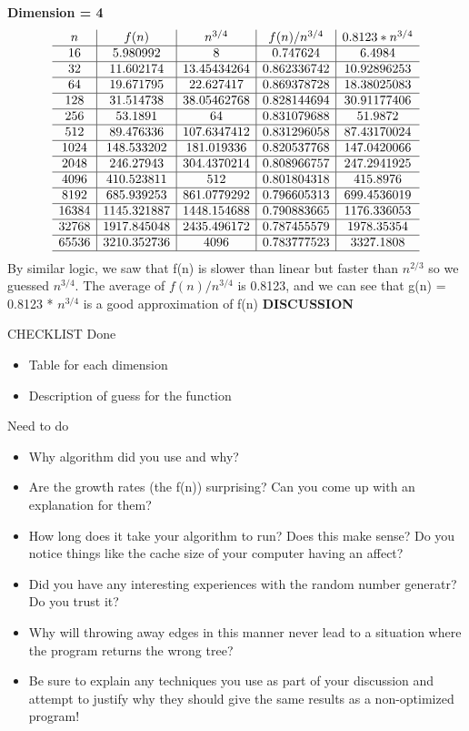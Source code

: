 \documentclass[11pt]{article}
\begin{document}
\textbf{Dimension = 4}
$$
\begin{array}{c|c|c|c|c}
n & f(n) & n^{3/4} & f(n)/n^{3/4}  & 0.8123 * n^{3/4} \\ \hline 
16 & 5.980992 & 8 & 0.747624  & 6.4984\\ \hline
32 & 11.602174 &  13.45434264 & 0.862336742 & 10.92896253 \\ \hline
64 & 19.671795  & 22.627417 & 0.869378728 & 18.38025083\\ \hline
128 & 31.514738 & 38.05462768 & 0.828144694 & 30.91177406\\ \hline
256 & 53.1891 & 64 & 0.831079688 & 51.9872\\ \hline
512 & 89.476336  & 107.6347412  & 0.831296058 & 87.43170024\\ \hline
1024 & 148.533202 & 181.019336 & 0.820537768 & 147.0420066 \\ \hline
2048 & 246.27943  & 304.4370214 & 0.808966757 & 247.2941925 \\ \hline
4096 & 410.523811 & 512 & 0.801804318 & 415.8976 \\ \hline
8192 & 685.939253 & 861.0779292 & 0.796605313 & 699.4536019 \\ \hline
16384 & 1145.321887 & 1448.154688 & 0.790883665 & 1176.336053\\ \hline
32768 & 1917.845048 & 2435.496172 & 0.787455579 & 1978.35354 \\ \hline
65536 & 3210.352736 & 4096 & 0.783777523 & 3327.1808 \\ \hline
\end{array}
$$
By similar logic, we saw that f(n) is slower than linear but faster than $n^{2/3}$ so we guessed $n^{3/4}$. The average of $f(n)/n^{3/4}$ is 0.8123, and we can see that g(n) = 0.8123 * $n^{3/4}$ is a good approximation of f(n)
\newpage
\textbf{DISCUSSION}

CHECKLIST \newline
Done
\begin{itemize}
\item Table for each dimension
\item Description of guess for the function 
\end{itemize}
Need to do
\begin{itemize}

\item Why algorithm did you use and why? 
\item Are the growth rates (the f(n)) surprising? Can you come up with an explanation for them?
\item How long does it take your algorithm to run? Does this make sense? Do you notice things like the cache size of your computer having an affect?
\item Did you have any interesting experiences with the random number generatr? Do you trust it?
\item Why will throwing away edges in this manner never lead to a situation where the program returns the wrong tree? 
\item Be sure to explain any techniques you use as part of your discussion and attempt to justify why they should give the same results as a non-optimized program!
\end{itemize}
\end{document}
